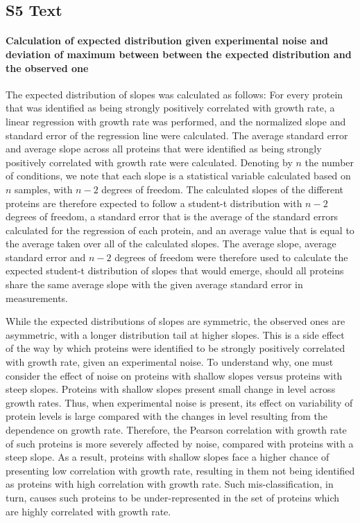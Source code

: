 \documentclass[10pt,letterpaper]{article}
\begin{document}
\subsection*{S5 Text}
\label{slopedistexp}
\paragraph{Calculation of expected distribution given experimental noise and deviation of maximum between between the expected distribution and the observed one}
The expected distribution of slopes was calculated as follows:
For every protein that was identified as being strongly positively correlated with growth rate, a linear regression with growth rate was performed, and the normalized slope and standard error of the regression line were calculated.
The average standard error and average slope across all proteins that were identified as being strongly positively correlated with growth rate were calculated.
Denoting by $n$ the number of conditions, we note that each slope is a statistical variable calculated based on $n$ samples, with $n-2$ degrees of freedom.
The calculated slopes of the different proteins are therefore expected to follow a student-t distribution with $n-2$ degrees of freedom, a standard error that is the average of the standard errors calculated for the regression of each protein, and an average value that is equal to the average taken over all of the calculated slopes.
The average slope, average standard error and $n-2$ degrees of freedom were therefore used to calculate the expected student-t distribution of slopes that would emerge, should all proteins share the same average slope with the given average standard error in measurements.

While the expected distributions of slopes are symmetric, the observed ones are asymmetric, with a longer distribution tail at higher slopes.
This is a side effect of the way by which proteins were identified to be strongly positively correlated with growth rate, given an experimental noise.
To understand why, one must consider the effect of noise on proteins with shallow slopes versus proteins with steep slopes.
Proteins with shallow slopes present small change in level across growth rates.
Thus, when experimental noise is present, its effect on variability of protein levels is large compared with the changes in level resulting from the dependence on growth rate.
Therefore, the Pearson correlation with growth rate of such proteins is more severely affected by noise, compared with proteins with a steep slope.
As a result, proteins with shallow slopes face a higher chance of presenting low correlation with growth rate, resulting in them not being identified as proteins with high correlation with growth rate.
Such mis-classification, in turn, causes such proteins to be under-represented in the set of proteins which are highly correlated with growth rate.
\end{document}
